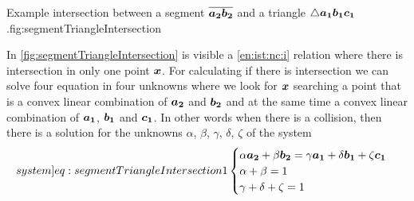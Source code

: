 \documentclass[dissertation.tex]{subfiles}
\begin{document}
\begin{myfig}{Example intersection between a segment
    $\overline{\boldsymbol{a_2}\boldsymbol{b_2}}$ and a triangle $\triangle \boldsymbol{a_1}\boldsymbol{b_1}\boldsymbol{c_1}$.}{fig:segmentTriangleIntersection}
\end{myfig}
In \cref{fig:segmentTriangleIntersection} is visible a
\cref{en:ist:nc:i} relation where there is intersection in only one
point $\boldsymbol{x}$. For calculating if there is intersection we can solve
four equation in four unknowns \cite{schneider} where we look for
$\boldsymbol{x}$ searching a point that is a convex linear
combination of $\boldsymbol{a_2}$ and $\boldsymbol{b_2}$ and at the same time a convex
linear combination of $\boldsymbol{a_1}$,
$\boldsymbol{b_1}$ and $\boldsymbol{c_1}$. In other words when there is a collision,
then there is a solution for the unknowns
$\alpha$, $\beta$, $\gamma$, $\delta$, $\zeta$ of the system
\begin{equation}\label[system]{eq:segmentTriangleIntersection1}
  \begin{cases}
    \alpha \ve{a_2} + \beta\ve{b_2}=\gamma\ve{a_1}+\delta\ve{b_1}+\zeta\ve{c_1} \\
    \alpha + \beta = 1\\
    \gamma + \delta +\zeta=1
  \end{cases}
\end{equation}
\end{document}
